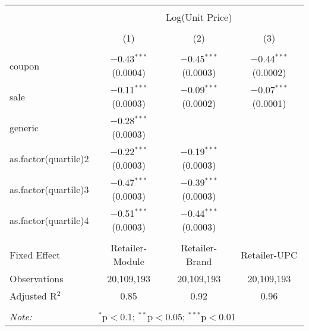 
\begin{table}[!htbp] \centering 
  \caption{} 
  \label{tab:overallSavingsNonStorable} 
\begin{tabular}{@{\extracolsep{5pt}}lccc} 
\\[-1.8ex]\hline 
\hline \\[-1.8ex] 
 & \multicolumn{3}{c}{Log(Unit Price)} \\ 
\\[-1.8ex] & (1) & (2) & (3)\\ 
\hline \\[-1.8ex] 
 coupon & $-$0.43$^{***}$ (0.0004) & $-$0.45$^{***}$ (0.0003) & $-$0.44$^{***}$ (0.0002) \\ 
  sale & $-$0.11$^{***}$ (0.0003) & $-$0.09$^{***}$ (0.0002) & $-$0.07$^{***}$ (0.0001) \\ 
  generic & $-$0.28$^{***}$ (0.0003) &  &  \\ 
  as.factor(quartile)2 & $-$0.22$^{***}$ (0.0003) & $-$0.19$^{***}$ (0.0003) &  \\ 
  as.factor(quartile)3 & $-$0.47$^{***}$ (0.0003) & $-$0.39$^{***}$ (0.0003) &  \\ 
  as.factor(quartile)4 & $-$0.51$^{***}$ (0.0003) & $-$0.44$^{***}$ (0.0003) &  \\ 
 \hline \\[-1.8ex] 
Fixed Effect & Retailer-Module & Retailer-Brand & Retailer-UPC \\ 
Observations & 20,109,193 & 20,109,193 & 20,109,193 \\ 
Adjusted R$^{2}$ & 0.85 & 0.92 & 0.96 \\ 
\hline 
\hline \\[-1.8ex] 
\textit{Note:}  & \multicolumn{3}{l}{$^{*}$p$<$0.1; $^{**}$p$<$0.05; $^{***}$p$<$0.01} \\ 
\end{tabular} 
\end{table} 
